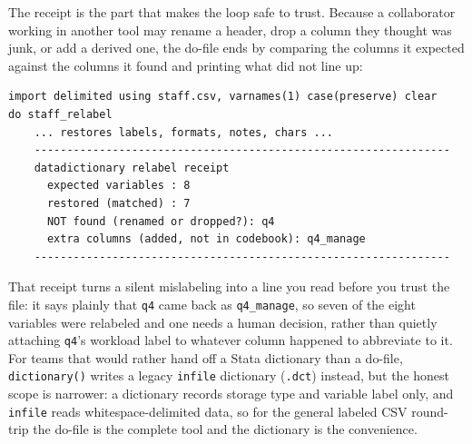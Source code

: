 \documentclass[
    a4paper,
    fontsize=10pt,
    twoside=true,
    numbers=noenddot,
]{kaobook}
\begin{document}
The receipt is the part that makes the loop safe to trust. Because a collaborator working in another tool may rename a header, drop a column they thought was junk, or add a derived one, the do-file ends by comparing the columns it expected against the columns it found and printing what did not line up:
\par
{\footnotesize
\begin{verbatim}
import delimited using staff.csv, varnames(1) case(preserve) clear
do staff_relabel
    ... restores labels, formats, notes, chars ...
    ----------------------------------------------------------------
    datadictionary relabel receipt
      expected variables : 8
      restored (matched) : 7
      NOT found (renamed or dropped?): q4
      extra columns (added, not in codebook): q4_manage
    ----------------------------------------------------------------
\end{verbatim}
}
That receipt turns a silent mislabeling into a line you read before you trust the file: it says plainly that \texttt{q4} came back as \texttt{q4\_manage}, so seven of the eight variables were relabeled and one needs a human decision, rather than quietly attaching \texttt{q4}'s workload label to whatever column happened to abbreviate to it. For teams that would rather hand off a Stata dictionary than a do-file, \texttt{dictionary()} writes a legacy \texttt{infile} dictionary (\texttt{.dct}) instead, but the honest scope is narrower: a dictionary records storage type and variable label only, and \texttt{infile} reads whitespace-delimited data, so for the general labeled CSV round-trip the do-file is the complete tool and the dictionary is the convenience.
\end{document}
